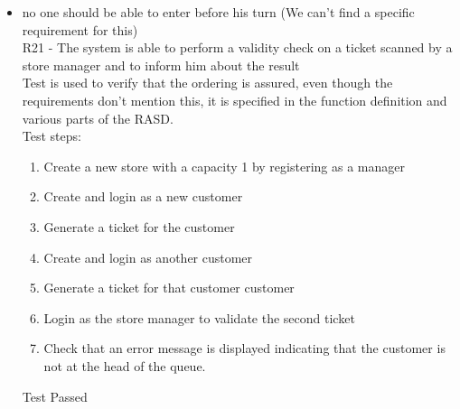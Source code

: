 \begin{itemize}
    \item no one should be able to enter before his turn (We can't find a specific requirement for this) \\
    R21 - The system is able to perform a validity check on a ticket scanned by a store manager and to inform him about the result \\
    Test is used to verify that the ordering is assured, even though the requirements don't mention this, it is specified in the function definition and various parts of the RASD.\\
    Test steps:
    \begin{enumerate}
        \item Create a new store with a capacity 1 by registering as a manager
        \item Create and login as a new customer
        \item Generate a ticket for the customer
        \item Create and login as another customer
        \item Generate a ticket for that customer customer
        \item Login as the store manager to validate the second ticket
        \item Check that an error message is displayed indicating that the customer is not at the head of the queue.
    \end{enumerate}
    Test Passed\\
\end{itemize}
